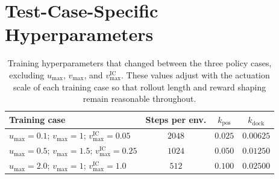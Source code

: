 \section{Test-Case-Specific Hyperparameters}

\begin{table}[H]
\centering
\footnotesize
\caption{Training hyperparameters that changed between the three policy cases, excluding $u_{\max}$, $v_{\max}$, and $v_{\max}^{\mathrm{IC}}$. These values adjust with the actuation scale of each training case so that rollout length and reward shaping remain reasonable throughout.}
\label{tab:training-hyperparameters-case-specific}
\begin{tabular}{@{}p{}ccc@{}}
\toprule
\textbf{Training case} & \textbf{Steps per env.} & \textbf{$k_{\mathrm{pos}}$} & \textbf{$k_{\mathrm{dock}}$} \\
\midrule
$u_{\max}=0.1$; $v_{\max}=1$; $v_{\max}^{\mathrm{IC}}=0.05$ & $2048$ & $0.025$ & $0.00625$ \\
$u_{\max}=0.5$; $v_{\max}=1.5$; $v_{\max}^{\mathrm{IC}}=0.25$ & $1024$ & $0.050$ & $0.01250$ \\
$u_{\max}=2.0$; $v_{\max}=1$; $v_{\max}^{\mathrm{IC}}=1.0$ & $512$ & $0.100$ & $0.02500$ \\
\bottomrule
\end{tabular}
\end{table}
